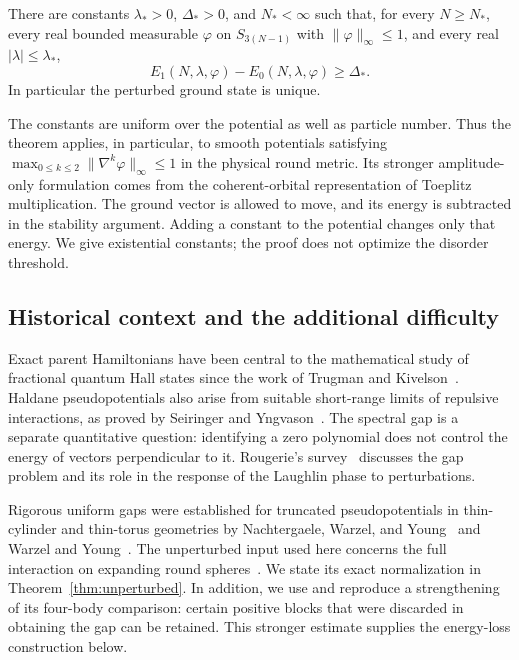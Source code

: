 \begin{theorem}\label{thm:main}
There are constants $\lambda_*>0$, $\Delta_*>0$, and
$N_*<\infty$ such that, for every $N\ge N_*$, every real
bounded measurable $\varphi$ on $S_{3(N-1)}$ with
$\|\varphi\|_\infty\le1$, and every real
$|\lambda|\le\lambda_*$,
\begin{equation}\label{eq:intro-stability}
 E_1(N,\lambda,\varphi)-E_0(N,\lambda,\varphi)\ge\Delta_*.
\end{equation}
In particular the perturbed ground state is unique.
\end{theorem}

The constants are uniform over the potential as well as particle number.
Thus the theorem applies, in particular, to smooth potentials satisfying
$\max_{0\le k\le2}\|\nabla^k\varphi\|_\infty\le1$ in the
physical round metric. Its stronger amplitude-only formulation comes
from the coherent-orbital representation of Toeplitz multiplication.
The ground vector is allowed to move, and its energy is subtracted in
the stability argument. Adding a constant to the potential changes
only that energy. We give existential constants; the proof does not
optimize the disorder threshold.

\subsection{Historical context and the additional difficulty}

Exact parent Hamiltonians have been central to the mathematical study
of fractional quantum Hall states since the work of Trugman and
Kivelson~\cite{TK}. Haldane pseudopotentials also arise from suitable
short-range limits of repulsive interactions, as proved by Seiringer
and Yngvason~\cite{SY}. The spectral gap is a separate quantitative
question: identifying a zero polynomial does not control the energy
of vectors perpendicular to it. Rougerie's survey~\cite{Rougerie}
discusses the gap problem and its role in the response of the Laughlin
phase to perturbations.

Rigorous uniform gaps were established for truncated pseudopotentials
in thin-cylinder and thin-torus geometries by Nachtergaele, Warzel,
and Young~\cite{NWY} and Warzel and Young~\cite{WY}. The unperturbed
input used here concerns the full interaction on expanding round
spheres~\cite{Gap}. We state its exact normalization in
Theorem~\ref{thm:unperturbed}. In addition, we use and reproduce a
strengthening of its four-body comparison: certain positive blocks
that were discarded in obtaining the gap can be retained. This
stronger estimate supplies the energy-loss construction below.

